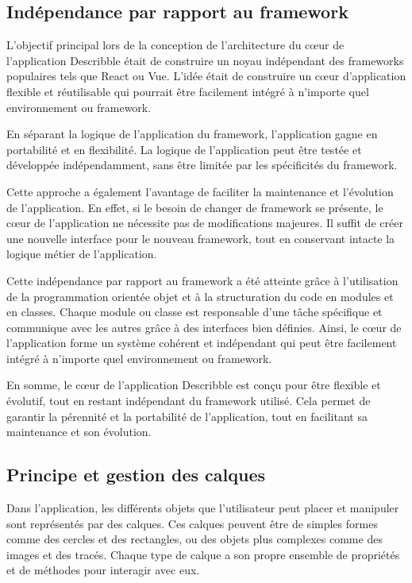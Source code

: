\subsection{Indépendance par rapport au framework}

L'objectif principal lors de la conception de l'architecture du c\oe{}ur de l'application \gls{Describble} était de construire un noyau indépendant des frameworks populaires tels que React ou Vue. L'idée était de construire un c\oe{}ur d'application flexible et réutilisable qui pourrait être facilement intégré à n'importe quel environnement ou framework.

En séparant la logique de l'application du framework, l'application gagne en portabilité et en flexibilité. La logique de l'application peut être testée et développée indépendamment, sans être limitée par les spécificités du framework.

Cette approche a également l'avantage de faciliter la maintenance et l'évolution de l'application. En effet, si le besoin de changer de framework se présente, le c\oe{}ur de l'application ne nécessite pas de modifications majeures. Il suffit de créer une nouvelle interface pour le nouveau framework, tout en conservant intacte la logique métier de l'application.

Cette indépendance par rapport au framework a été atteinte grâce à l'utilisation de la programmation orientée objet et à la structuration du code en modules et en classes. Chaque module ou classe est responsable d'une tâche spécifique et communique avec les autres grâce à des interfaces bien définies. Ainsi, le c\oe{}ur de l'application forme un système cohérent et indépendant qui peut être facilement intégré à n'importe quel environnement ou framework.

En somme, le c\oe{}ur de l'application \gls{Describble} est conçu pour être flexible et évolutif, tout en restant indépendant du framework utilisé. Cela permet de garantir la pérennité et la portabilité de l'application, tout en facilitant sa maintenance et son évolution.

\subsection{Principe et gestion des calques}

Dans l'application, les différents objets que l'utilisateur peut placer et manipuler sont représentés par des calques. Ces calques peuvent être de simples formes comme des cercles et des rectangles, ou des objets plus complexes comme des images et des tracés. Chaque type de calque a son propre ensemble de propriétés et de méthodes pour interagir avec eux.

